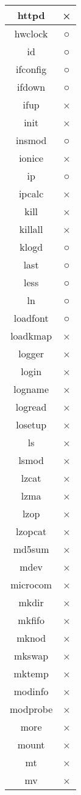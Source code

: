 \begin{longtable}{cc}
httpd & × \\ \hline
hwclock & ○ \\ \hline
id & ○ \\ \hline
ifconfig & ○ \\ \hline
ifdown & ○ \\ \hline
ifup & × \\ \hline
init & × \\ \hline
insmod & ○ \\ \hline
ionice & × \\ \hline
ip & ○ \\ \hline
ipcalc & × \\ \hline
kill & × \\ \hline
killall & × \\ \hline
klogd & ○ \\ \hline
last & ○ \\ \hline
less & ○ \\ \hline
ln & ○ \\ \hline
loadfont & ○ \\ \hline
loadkmap & × \\ \hline
logger & × \\ \hline
login & × \\ \hline
logname & × \\ \hline
logread & × \\ \hline
losetup & × \\ \hline
ls & × \\ \hline
lsmod & × \\ \hline
lzcat & × \\ \hline
lzma & × \\ \hline
lzop & × \\ \hline
lzopcat & × \\ \hline
md5sum & × \\ \hline
mdev & × \\ \hline
microcom & × \\ \hline
mkdir & × \\ \hline
mkfifo & × \\ \hline
mknod & × \\ \hline
mkswap & × \\ \hline
mktemp & × \\ \hline
modinfo & × \\ \hline
modprobe & × \\ \hline
more & × \\ \hline
mount & × \\ \hline
mt & × \\ \hline
mv & × \\ \hline

\end{longtable}
